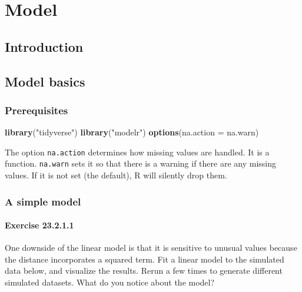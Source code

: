 \documentclass[]{book}
\newenvironment{Shaded}{\begin{snugshade}}{\end{snugshade}}
\newcommand{\DataTypeTok}[1]{\textcolor[rgb]{0.13,0.29,0.53}{#1}}
\newcommand{\KeywordTok}[1]{\textcolor[rgb]{0.13,0.29,0.53}{\textbf{#1}}}
\newcommand{\NormalTok}[1]{#1}
\newcommand{\StringTok}[1]{\textcolor[rgb]{0.31,0.60,0.02}{#1}}
\theoremstyle{plain}
\theoremstyle{remark}
\begin{document}
\hypertarget{part-model}{%
\part{Model}\label{part-model}}

\hypertarget{model-intro}{%
\chapter{Introduction}\label{model-intro}}

\hypertarget{model-basics}{%
\chapter{Model basics}\label{model-basics}}

\hypertarget{prerequisites-1}{%
\section{Prerequisites}\label{prerequisites-1}}

\begin{Shaded}
\begin{Highlighting}[]
\KeywordTok{library}\NormalTok{(}\StringTok{"tidyverse"}\NormalTok{)}
\KeywordTok{library}\NormalTok{(}\StringTok{"modelr"}\NormalTok{)}
\KeywordTok{options}\NormalTok{(}\DataTypeTok{na.action =}\NormalTok{ na.warn)}
\end{Highlighting}
\end{Shaded}

The option \texttt{na.action} determines how missing values are handled.
It is a function. \texttt{na.warn} sets it so that there is a warning if
there are any missing values. If it is not set (the default), R will
silently drop them.

\hypertarget{a-simple-model}{%
\section{A simple model}\label{a-simple-model}}

\hypertarget{exercise-23.2.1.1}{%
\subsection*{\texorpdfstring{Exercise
{23.2.1.1}}{Exercise 23.2.1.1}}\label{exercise-23.2.1.1}}

One downside of the linear model is that it is sensitive to unusual
values because the distance incorporates a squared term. Fit a linear
model to the simulated data below, and visualize the results. Rerun a
few times to generate different simulated datasets. What do you notice
about the model?
\end{document}

